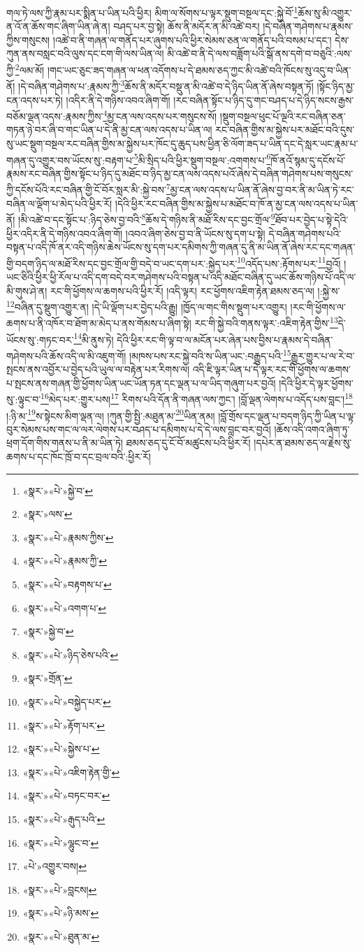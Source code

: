 གལ་ཏེ་ལས་ཀྱི་རྣམ་པར་སྨིན་པ་ཡིན་པའི་ཕྱིར། མིག་ལ་སོགས་པ་ལྟར་སྡུག་བསྔལ་དང་:སྐྱེ་བོ་\footnote{«སྣར་»«པེ་»སྐྱེ་བ་}ཆོས་སུ་མི་འགྱུར་ན་འོ་ན་ཆོས་གང་ཞིག་ཡིན་ཞེ་ན། བཤད་པར་བྱ་སྟེ། ཆོས་ནི་མདོར་ན་མི་འཚེ་བར། །དེ་བཞིན་གཤེགས་པ་རྣམས་ཀྱིས་གསུངས། །འཚེ་བ་ནི་གཞན་ལ་གནོད་པར་ཞུགས་པའི་ཕྱིར་སེམས་ཅན་ལ་གནོད་པའི་བསམ་པ་དང་། དེས་ཀུན་ནས་བསླང་བའི་ལུས་དང་ངག་གི་ལས་ཡིན་ལ། མི་འཚེ་བ་ནི་དེ་ལས་བཟློག་པའི་སྒོ་ནས་དགེ་བ་བཅུའི་:ལས་ཀྱི་\footnote{«སྣར་»ལས་}ལམ་མོ། །གང་ཡང་ཅུང་ཟད་གཞན་ལ་ཕན་འདོགས་པ་དེ་ཐམས་ཅད་ཀྱང་མི་འཚེ་བའི་ཁོངས་སུ་འདུ་བ་ཡིན་ནོ། །དེ་བཞིན་གཤེགས་པ་:རྣམས་ཀྱི་\footnote{«སྣར་»«པེ་»རྣམས་ཀྱིས་}ཆོས་ནི་མདོར་བསྡུ་ན་མི་འཚེ་བ་དེ་ཉིད་ཡིན་ནོ་ཞེས་བསྟན་ཏོ། །སྟོང་ཉིད་མྱ་ངན་འདས་པར་ཏེ། །འདིར་ནི་དེ་གཉིས་འབའ་ཞིག་གོ། །རང་བཞིན་སྟོང་པ་ཉིད་དུ་གང་བཤད་པ་དེ་ཉིད་སངས་རྒྱས་བཅོམ་ལྡན་འདས་:རྣམས་ཀྱིས་\footnote{«སྣར་»«པེ་»རྣམས་ཀྱི་}མྱ་ངན་ལས་འདས་པར་གསུངས་སོ། །སྡུག་བསྔལ་ཕུང་པོ་ལྔའི་རང་བཞིན་ཅན་གཏན་ཉེ་བར་ཞི་བ་གང་ཡིན་པ་དེ་ནི་མྱ་ངན་ལས་འདས་པ་ཡིན་ལ། རང་བཞིན་གྱིས་མ་སྐྱེས་པར་མཐོང་བའི་དུས་སུ་ཡང་སྡུག་བསྔལ་རང་བཞིན་གྱིས་མ་སྐྱེས་པར་ཁོང་དུ་ཆུད་པས་ཕྱིན་ཅི་ལོག་ཟད་པ་ཡིན་དང་དེ་སླར་ཡང་རྣམ་པ་གཞན་དུ་འགྱུར་བས་ཡོངས་སུ་:བརྟག་པ་\footnote{«སྣར་»«པེ་»བརྟགས་པ་}མི་སྲིད་པའི་ཕྱིར་སྡུག་བསྔལ་:འགགས་པ་\footnote{«སྣར་»«པེ་»འགག་པ་}ཁོ་ནའོ་སྙམ་དུ་དངོས་པོ་རྣམས་རང་བཞིན་གྱིས་སྟོང་པ་ཉིད་དུ་མཐོང་བ་ཉིད་མྱ་ངན་ལས་འདས་པའོ་ཞེས་དེ་བཞིན་གཤེགས་པས་གསུངས་ཀྱི་དངོས་པོའི་རང་བཞིན་གྱི་ངོ་བོར་སླར་མི་:སྐྱེ་བས་\footnote{«སྣར་»སྐྱེ་བ་}མྱ་ངན་ལས་འདས་པ་ཡིན་ནོ་ཞེས་བྱ་བར་ནི་མ་ཡིན་ཏེ་རང་བཞིན་ལ་ལྡོག་པ་མེད་པའི་ཕྱིར་རོ། །དེའི་ཕྱིར་རང་བཞིན་གྱིས་མ་སྐྱེས་པ་མཐོང་བ་ཁོ་ན་མྱ་ངན་ལས་འདས་པ་ཡིན་ནོ། །མི་འཚེ་བ་དང་སྟོང་པ་:ཉིད་ཅེས་བྱ་བའི་\footnote{«སྣར་»«པེ་»ཉིད་ཅེས་པའི་}ཆོས་དེ་གཉིས་ནི་མཐོ་རིས་དང་བྱང་གྲོལ་\footnote{«སྣར་»གྲོན་}ཐོབ་པར་བྱེད་པ་སྟེ་དེའི་ཕྱིར་འདིར་ནི་དེ་གཉིས་འབའ་ཞིག་གོ། །འབའ་ཞིག་ཅེས་བྱ་བ་ནི་ཡོངས་སུ་དག་པ་སྟེ། དེ་བཞིན་གཤེགས་པའི་བསྟན་པ་འདི་ཁོ་ནར་འདི་གཉིས་ཆེས་ཡོངས་སུ་དག་པར་དམིགས་ཀྱི་གཞན་དུ་ནི་མ་ཡིན་ནོ་ཞེས་རང་དང་གཞན་གྱི་བདག་ཉིད་ལ་མཐོ་རིས་དང་བྱང་གྲོལ་གྱི་བདེ་བ་ཡང་དག་པར་:སྐྱེད་པར་\footnote{«སྣར་»«པེ་»བསྐྱེད་པར་}འདོད་པས་:རྟོགས་པར་\footnote{«སྣར་»«པེ་»རྟོག་པར་}བྱའོ། །ཡང་ཅིའི་ཕྱིར་ཕྱི་རོལ་པ་འདི་དག་བདེ་བར་གཤེགས་པའི་བསྟན་པ་འདི་མཐོང་བཞིན་དུ་ཡང་ཆོས་གཉིས་པོ་འདི་ལ་མི་གུས་ཤེ་ན། རང་གི་ཕྱོགས་ལ་ཆགས་པའི་ཕྱིར་རོ། །འདི་ལྟར། རང་ཕྱོགས་འཇིག་རྟེན་ཐམས་ཅད་ལ། །:སྐྱེ་ས་\footnote{«སྣར་»«པེ་»སྐྱེས་པ་}བཞིན་དུ་སྡུག་འགྱུར་ན། །དེ་ཡི་ལྡོག་པར་བྱེད་པའི་རྒྱུ། །ཁྱོད་ལ་གང་གིས་སྡུག་པར་འགྱུར། །རང་གི་ཕྱོགས་ལ་ཆགས་པ་ནི་འཁོར་བ་ཐོག་མ་མེད་པ་ནས་གོམས་པ་ཞིག་སྟེ། རང་གི་སྐྱེ་བའི་གནས་ལྟར་:འཇིག་རྟེན་གྱིས་\footnote{«སྣར་»«པེ་»འཇིག་རྟེན་གྱི་}དེ་ཡོངས་སུ་:གཏང་བར་\footnote{«སྣར་»«པེ་»བཏང་བར་}མི་ནུས་ཏེ། དེའི་ཕྱིར་རང་གི་ལྟ་བ་ལ་མངོན་པར་ཞེན་པས་བྱིས་པ་རྣམས་དེ་བཞིན་གཤེགས་པའི་ཆོས་འདི་ལ་མི་འཇུག་གོ། །མཁས་པས་རང་སྐྱེ་བའི་ས་ཡིན་ཡང་:བརྒྱུད་པའི་\footnote{«སྣར་»«པེ་»རྒུད་པའི་}རྒྱུར་གྱུར་པ་ལ་རེ་བ་སྤངས་ནས་འབྱོར་པ་བྱེད་པའི་ཡུལ་ལ་བརྟེན་པར་རིགས་ལ། འདི་ཇི་ལྟར་ཡིན་པ་དེ་ལྟར་རང་གི་ཕྱོགས་ལ་ཆགས་པ་སྤངས་ནས་གཞན་གྱི་ཕྱོགས་ཡིན་ཡང་ཡོན་ཏན་དང་ལྡན་པ་ལ་ཡིད་གཞུག་པར་བྱའོ། །དེའི་ཕྱིར་དེ་ལྟར་ཕྱོགས་སུ་:ལྟུང་བ་\footnote{«སྣར་»«པེ་»ལྷུང་བ་}མེད་པར་:གྱུར་པས།\footnote{«པེ་»འགྱུར་བས།} རིགས་པའི་དོན་ནི་གཞན་ལས་ཀྱང་། །བློ་ལྡན་ལེགས་པ་འདོད་པས་བླང་།\footnote{«སྣར་»«པེ་»བླངས།} །:ཉི་མ་\footnote{«སྣར་»«པེ་»ཉི་མས་}ས་སྟེངས་མིག་ལྡན་ལ། །ཀུན་གྱི་སྤྱི་:མཐུན་མ་\footnote{«སྣར་»«པེ་»ཐུན་མ་}ཡིན་ནམ། །བློ་གྲོས་དང་ལྡན་པ་བདག་ཉིད་ཀྱི་ཡིན་པ་ལྟ་བུར་སེམས་པས་གང་ལ་ལར་ལེགས་པར་བཤད་པ་དམིགས་པ་དེ་དེ་ལས་བླང་བར་བྱའོ། །ཆོས་འདི་འགའ་ཞིག་ཏུ་ཕྲག་དོག་གིས་གནས་པ་ནི་མ་ཡིན་ཏེ། ཐམས་ཅད་དུ་ངོ་བོ་མཚུངས་པའི་ཕྱིར་རོ། །དཔེར་ན་ཐམས་ཅད་ལ་རྗེས་སུ་ཆགས་པ་དང་ཁོང་ཁྲོ་བ་དང་བྲལ་བའི་:ཕྱིར་རོ། 